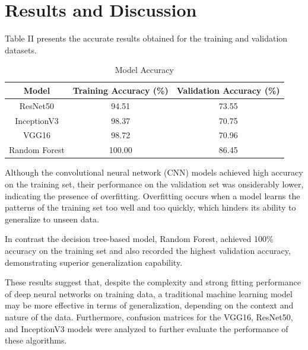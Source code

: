 \documentclass[10pt,conference]{IEEEtran}
\begin{document}
\section*{Results and Discussion}
Table II presents the accurate results obtained for the training and validation datasets. 
\begin{table}[!h]
\renewcommand{\arraystretch}{1.3}
\caption{Model Accuracy}
\label{table:model_accuracy}
\centering
\begin{tabular}{|c|c|c|}
\hline
\textbf{Model} & \textbf{Training Accuracy (\%)} & \textbf{Validation Accuracy (\%)} \\
\hline
ResNet50 & 94.51 & 73.55 \\
\hline
InceptionV3 & 98.37 & 70.75 \\
\hline
VGG16 & 98.72 & 70.96 \\
\hline
Random Forest & 100.00 & 86.45 \\
\hline
\end{tabular}
\end{table}

Although the convolutional neural network (CNN) models achieved high accuracy on the training set, their performance on the validation set was onsiderably lower, indicating the presence of overfitting. Overfitting occurs when a model learns the patterns of the training set too well and too quickly, which hinders its ability to generalize to unseen data. 

In contrast the decision tree-based model, Random Forest, achieved 100\% accuracy on the training set and also recorded the highest validation accuracy, demonstrating superior generalization capability. 

These results suggest that, despite the complexity and strong fitting performance of deep neural networks on training data, a traditional machine learning model may be more effective in terms of generalization, depending on the context and nature of the data. 
Furthermore, confusion matrices for the VGG16, ResNet50, and InceptionV3 models were analyzed to further evaluate the performance of these algorithms.
\end{document}
